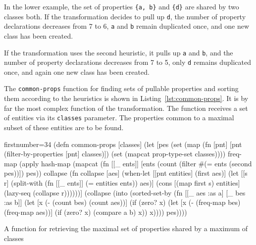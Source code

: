 \documentclass[11pt]{article}
\begin{document}
In the lower example, the set of properties \verb|{a, b}| and \verb|{d}| are
shared by two classes both.  If the transformation decides to pull up \verb|d|,
the number of property declarations decreases from 7 to 6, \verb|a| and
\verb|b| remain duplicated once, and one new class has been created.

If the transformation uses the second heuristic, it pulls up \verb|a| and
\verb|b|, and the number of property declarations decreases from 7 to 5, only
\verb|d| remains duplicated once, and again one new class has been created.

The \verb|common-props| function for finding sets of pullable properties and
sorting them according to the heuristics is shown in
Listing~\ref{lst:common-props}.  It is by far the most complex function of the
transformation.  The function receives a set of entities via its \verb|classes|
parameter.  The properties common to a maximal subset of these entities are to
be found.

\begin{listing}[b!]
  \begin{clojurecode*}{firstnumber=34}
(defn common-props [classes]
  (let [pes (set (map (fn [pnt]
                        [pnt (filter-by-properties [pnt] classes)])
                      (set (mapcat prop-type-set classes))))
        freq-map (apply hash-map
                        (mapcat (fn [[_ ents]]
                                  [ents (count (filter #(= ents (second %
                                                       pes))])
                                pes))
        collapse (fn collapse [aes]
                   (when-let [[pnt entities] (first aes)]
                     (let [[s r] (split-with (fn [[_ ents]]
                                               (= entities ents)) aes)]
                       (cons [(map first s) entities]
                             (lazy-seq (collapse r))))))]
    (collapse (into (sorted-set-by
                     (fn [[_ aes :as a] [_ bes :as b]]
                       (let [x (- (count bes) (count aes))]
                         (if (zero? x)
                           (let [x (- (freq-map bes) (freq-map aes))]
                             (if (zero? x)
                               (compare a b)
                               x))
                           x))))
                    pes))))
  \end{clojurecode*}
  \caption{A function for retrieving the maximal set of properties shared by a
    maximum of classes}
  \label{lst:common-props}
\end{listing}
\end{document}
